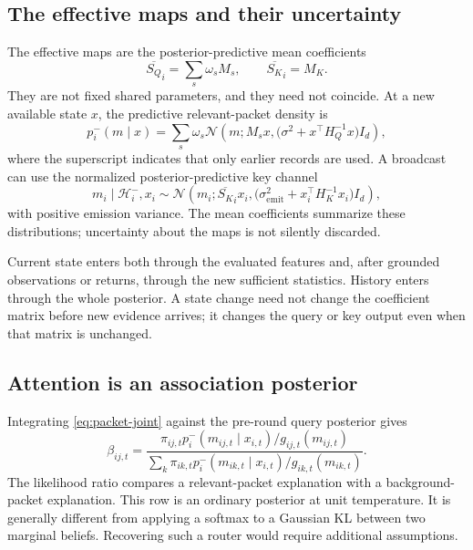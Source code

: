 \documentclass[11pt]{article}
\theoremstyle{definition}
\theoremstyle{remark}
\newcommand{\N}{\mathcal N}
\newcommand{\calH}{\mathcal H}
\newcommand{\SQ}{S_{Q}}
\newcommand{\SK}{S_{K}}
\begin{document}
\subsection{The effective maps and their uncertainty}

The effective maps are the posterior-predictive mean coefficients
\begin{equation}
\boxed{
\overline{\SQ}_i=\sum_s\omega_sM_s,\qquad
\overline{\SK}_i=M_K.
}
\label{eq:effective-maps}
\end{equation}
They are not fixed shared parameters, and they need not coincide. At a new available state \(x\), the predictive relevant-packet density is
\begin{equation}
p_i^-(m\mid x)
=
\sum_s\omega_s
\N\left(m;M_sx,\bigl(\sigma^2+x^\top H_Q^{-1}x\bigr)I_d\right),
\label{eq:query-predictive}
\end{equation}
where the superscript indicates that only earlier records are used. A broadcast can use the normalized posterior-predictive key channel
\begin{equation}
m_i\mid\calH_i^-,x_i
\sim
\N\left(m_i;\overline{\SK}_ix_i,
\bigl(\sigma_{\mathrm{emit}}^2+x_i^\top H_K^{-1}x_i\bigr)I_d\right),
\label{eq:emit}
\end{equation}
with positive emission variance. The mean coefficients summarize these distributions; uncertainty about the maps is not silently discarded.

Current state enters both through the evaluated features and, after grounded observations or returns, through the new sufficient statistics. History enters through the whole posterior. A state change need not change the coefficient matrix before new evidence arrives; it changes the query or key output even when that matrix is unchanged.

\subsection{Attention is an association posterior}

Integrating \eqref{eq:packet-joint} against the pre-round query posterior gives
\begin{equation}
\boxed{
\beta_{ij,t}
=
\frac{\pi_{ij,t}p_i^-(m_{ij,t}\mid x_{i,t})/g_{ij,t}(m_{ij,t})}
{\sum_k\pi_{ik,t}p_i^-(m_{ik,t}\mid x_{i,t})/g_{ik,t}(m_{ik,t})}.
}
\label{eq:attention}
\end{equation}
The likelihood ratio compares a relevant-packet explanation with a background-packet explanation. This row is an ordinary posterior at unit temperature. It is generally different from applying a softmax to a Gaussian KL between two marginal beliefs. Recovering such a router would require additional assumptions.
\end{document}
